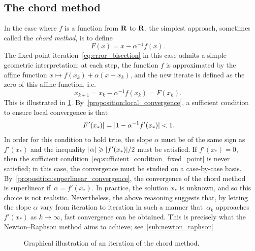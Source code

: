 \subsection{The chord method}
In the case where $f$ is a function from $\mathbf R$ to $\mathbf R$,
the simplest approach, sometimes called the \emph{chord method}, is to define
\[
    F(x) = x - \alpha^{-1} f(x).
\]
The fixed point iteration~\eqref{eq:error_bisection} in this case admits a simple geometric interpretation:
at each step, the function $f$ is approximated by the affine function $x \mapsto f(x_k) + \alpha (x - x_k)$,
and the new iterate is defined as the zero of this affine function,
i.e.
\begin{equation}
    \label{eq:naive_fixed_point}
    x_{k+1} = x_k - \alpha^{-1} f(x_k) = F(x_k).
\end{equation}
This is illustrated in \cref{fig:chord_method}.
By~\cref{proposition:local_convergence},
a sufficient condition to ensure local convergence is that
\begin{equation}
    \label{eq:sufficient_condition_fixed_point}
    \lvert F'(x_*)\rvert = \lvert1 - \alpha^{-1} f'(x_*)\rvert < 1.
\end{equation}
In order for this condition to hold true,
the slope $\alpha$ must be of the same sign as $f'(x_*)$
and the inequality $\lvert\alpha\rvert \geqslant \lvert f'(x_*)\rvert/2$ must be satisfied.
If $f'(x_*) = 0$,
then the sufficient condition~\eqref{eq:sufficient_condition_fixed_point} is never satisfied;
in this case, the convergence must be studied on a case-by-case basis.
By~\cref{proposition:superlinear_convergence},
the convergence of the chord method is superlinear if~$\alpha = f'(x_*)$.
In practice, the solution $x_*$ is unknown,
and so this choice is not realistic.
Nevertheless, the above reasoning suggests that, by letting the slope $\alpha$ vary from iteration to iteration in such a manner that~$\alpha_k$ approaches $f'(x_*)$ as $k \to \infty$,
fast convergence can be obtained.
This is precisely what the Newton--Raphson method aims to achieve;
see~\cref{sub:newton_raphson}
\begin{figure}[ht]
    \centering
    \caption{%
        Graphical illustration of an iteration of the chord method.
    }%
    \label{fig:chord_method}
\end{figure}

